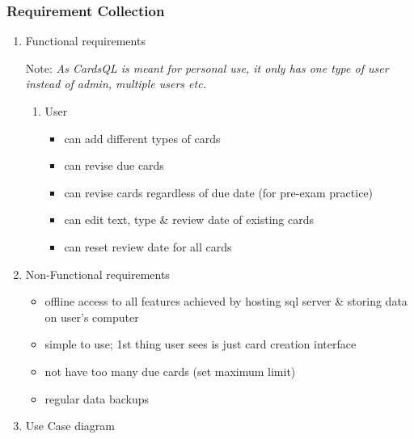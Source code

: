 \documentclass[a4paper]{article}
\begin{document}
\subsubsection{Requirement Collection}
\label{sec:org131ac3e}
\begin{enumerate}
\item Functional requirements
\label{sec:org7641953}

Note: \emph{As CardsQL is meant for personal use, it only has one type of user instead of admin, multiple users etc.}
\begin{enumerate}
\item User
\label{sec:orge8758aa}
\begin{itemize}
\item can add different types of cards
\item can revise due cards
\item can revise cards regardless of due date (for pre-exam practice)
\item can edit text, type  \& review date of existing cards
\item can reset review date for all cards
\end{itemize}
\end{enumerate}
\item Non-Functional requirements
\label{sec:org288cf94}
\begin{itemize}
\item offline access to all features 
achieved by hosting sql server \& storing data on user's computer
\item simple to use;
1st thing user sees is just card creation interface
\item not have too many due cards (set maximum limit)
\item regular data backups
\end{itemize}
\item Use Case diagram
\label{sec:org9a75c1d}


\end{enumerate}
\end{document}
